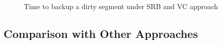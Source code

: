 \begin{figure}[htbp]
  \centering
  \caption{Time to backup a dirty segment under SRB and VC approach}
  \label{fig:srb_vs_vc}
\end{figure}








\subsection{Comparison with Other Approaches}

